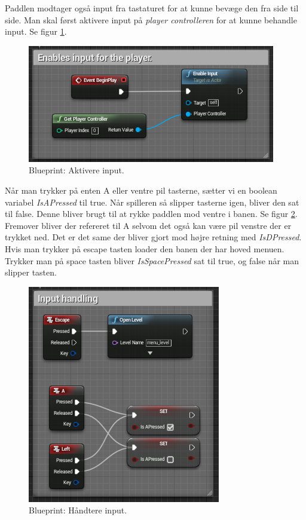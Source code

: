 Paddlen modtager også input fra tastaturet for at kunne bevæge den fra side til side. Man skal først aktivere input på \textit{player controlleren} for at kunne behandle input. Se figur \ref{dia:paddleenableinput}. 

\begin{figure}
	\begin{center}
		\caption{Blueprint: Aktivere input.}
		\label{dia:paddleenableinput}
		\includegraphics[width=0.80\linewidth]{pictures/blueprints/paddle-enable-input}
		\end{center}
\end{figure}

Når man trykker på enten A eller ventre pil tasterne, sætter vi en boolean variabel \textit{IsAPressed} til true. Når spilleren så slipper tasterne igen, bliver den sat til false. Denne bliver brugt til at rykke paddlen mod ventre i banen. Se figur \ref{dia:paddlehandleinput}. Fremover bliver der refereret til A selvom det også kan være pil venstre der er trykket ned. Det er det same der bliver gjort mod højre retning med \textit{IsDPressed}. Hvis man trykker på escape tasten loader den banen der har hoved menuen. Trykker man på space tasten bliver \textit{IsSpacePressed} sat til true, og false når man slipper tasten.

\begin{figure}
	\begin{center}
		\caption{Blueprint: Håndtere input.}
		\label{dia:paddlehandleinput}
		\includegraphics[width=0.60\linewidth]{pictures/blueprints/paddle-handle-input}
		\end{center}
\end{figure}

